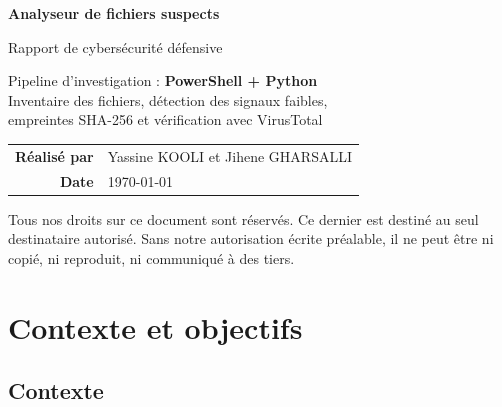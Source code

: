 \documentclass[12pt,a4paper]{article}
\begin{document}
\begin{titlepage}
  \centering
  \vspace*{2cm}

  {\Huge\bfseries\color{accent} Analyseur de fichiers suspects}

  \vspace{0.5cm}
  {\large\color{gray} Rapport de cybersécurité défensive}

  \vspace{3cm}
  \begin{tcolorbox}[colback=darkbg, colframe=accent, width=0.85\textwidth,
    arc=8pt, left=20pt, right=20pt, top=16pt, bottom=16pt]
    \color{white}
    \centering
    \large
    Pipeline d'investigation : \textbf{PowerShell + Python}\\[6pt]
    \normalsize\color{lightgray}
    Inventaire des fichiers, détection des signaux faibles,\\
    empreintes SHA-256 et vérification avec VirusTotal
  \end{tcolorbox}

  \vspace{3cm}

  \begin{tabular}{rl}
    \textbf{Réalisé par} & Yassine KOOLI et Jihene GHARSALLI \\[4pt]
    \textbf{Date}        & \today \\[7pt]
  \end{tabular}

  \vfill
  {\small\color{gray}
    Tous nos droits sur ce document sont réservés. Ce dernier est destiné au seul destinataire autorisé. Sans notre autorisation écrite préalable, il ne peut être ni copié, ni reproduit, ni communiqué à des tiers.
  }
\end{titlepage}

\tableofcontents
\newpage

\section{Contexte et objectifs}

\subsection{Contexte}
\end{document}
